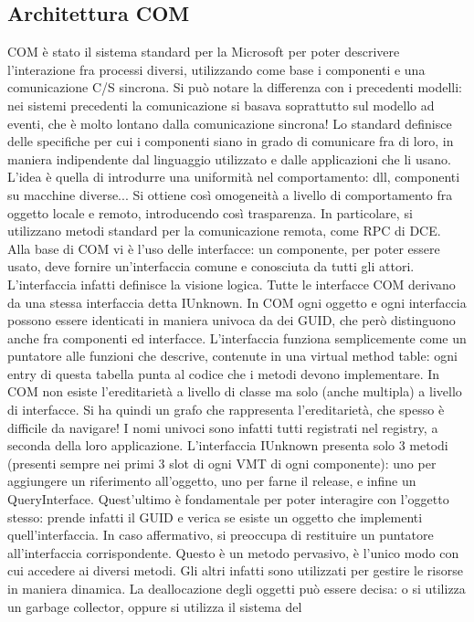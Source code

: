 \subsection{Architettura COM}
COM è stato il sistema standard per la Microsoft per poter descrivere l'interazione fra processi diversi, utilizzando
come base i componenti e una comunicazione C/S sincrona. Si può notare la differenza con i precedenti modelli: nei
sistemi precedenti la comunicazione si basava soprattutto sul modello ad eventi, che è molto lontano dalla comunicazione
sincrona!
Lo standard definisce delle specifiche per cui i componenti siano in grado di comunicare fra di loro, in maniera
indipendente dal linguaggio utilizzato e dalle applicazioni che li usano. L'idea è quella di introdurre una uniformità
nel comportamento: dll, componenti su macchine diverse... Si ottiene così omogeneità a livello di comportamento fra
oggetto locale e remoto, introducendo così trasparenza. In particolare, si utilizzano metodi standard per la
comunicazione remota, come RPC di DCE.
Alla base di COM vi è l'uso delle interfacce: un componente, per poter essere usato, deve fornire un'interfaccia comune
e conosciuta da tutti gli attori. L'interfaccia infatti definisce la visione logica. Tutte le interfacce COM
derivano da una stessa interfaccia detta IUnknown. In COM ogni oggetto e ogni interfaccia possono essere identicati in
maniera univoca da dei GUID, che però distinguono anche fra componenti ed interfacce.
L'interfaccia funziona semplicemente come un puntatore alle funzioni che descrive, contenute in una virtual method
table: ogni entry di questa tabella punta al codice che i metodi devono implementare. In COM non esiste l'ereditarietà
a livello di classe ma solo (anche multipla) a livello di interfacce. Si ha quindi un grafo che rappresenta
l'ereditarietà, che spesso è difficile da navigare! I nomi univoci sono infatti tutti registrati nel registry, a seconda
della loro applicazione.
L'interfaccia IUnknown presenta solo 3 metodi (presenti sempre nei primi 3 slot di ogni VMT di ogni componente): uno per
aggiungere un riferimento all'oggetto, uno per farne il release, e infine un QueryInterface. Quest'ultimo è fondamentale
per poter interagire con l'oggetto stesso: prende infatti il GUID e verica se esiste un oggetto che implementi
quell'interfaccia. In caso affermativo, si preoccupa di restituire un puntatore all'interfaccia corrispondente. Questo è
un metodo pervasivo, è l'unico modo con cui accedere ai diversi metodi. Gli altri infatti sono utilizzati per gestire le
risorse in maniera dinamica.
La deallocazione degli oggetti può essere decisa: o si utilizza un garbage collector, oppure si utilizza il sistema del
